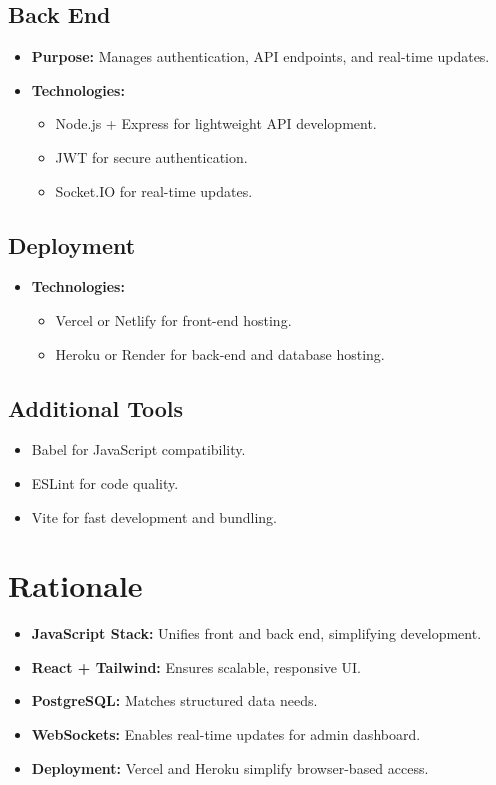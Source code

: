 \documentclass{article}
\begin{document}
\subsection{Back End}
\begin{itemize}
    \item \textbf{Purpose:} Manages authentication, API endpoints, and real-time updates.
    \item \textbf{Technologies:}
    \begin{itemize}
        \item Node.js + Express for lightweight API development.
        \item JWT for secure authentication.
        \item Socket.IO for real-time updates.
    \end{itemize}
\end{itemize}

\subsection{Deployment}
\begin{itemize}
    \item \textbf{Technologies:}
    \begin{itemize}
        \item Vercel or Netlify for front-end hosting.
        \item Heroku or Render for back-end and database hosting.
    \end{itemize}
\end{itemize}

\subsection{Additional Tools}
\begin{itemize}
    \item Babel for JavaScript compatibility.
    \item ESLint for code quality.
    \item Vite for fast development and bundling.
\end{itemize}

\section{Rationale}
\begin{itemize}
    \item \textbf{JavaScript Stack:} Unifies front and back end, simplifying development.
    \item \textbf{React + Tailwind:} Ensures scalable, responsive UI.
    \item \textbf{PostgreSQL:} Matches structured data needs.
    \item \textbf{WebSockets:} Enables real-time updates for admin dashboard.
    \item \textbf{Deployment:} Vercel and Heroku simplify browser-based access.
\end{itemize}
\end{document}
